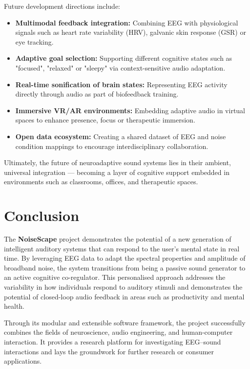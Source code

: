 Future development directions include:
\begin{itemize}
    \item \textbf{Multimodal feedback integration:} Combining EEG with physiological signals such as heart rate variability (HRV), galvanic skin response (GSR) or eye tracking.
    \item \textbf{Adaptive goal selection:} Supporting different cognitive states such as "focused", "relaxed" or "sleepy" via context-sensitive audio adaptation.
    \item \textbf{Real-time sonification of brain states:} Representing EEG activity directly through audio as part of biofeedback training.
    \item \textbf{Immersive VR/AR environments:} Embedding adaptive audio in virtual spaces to enhance presence, focus or therapeutic immersion.
    \item \textbf{Open data ecosystem:} Creating a shared dataset of EEG and noise condition mappings to encourage interdisciplinary collaboration.
\end{itemize}

Ultimately, the future of neuroadaptive sound systems lies in their ambient, universal integration — becoming a layer of cognitive support embedded in environments such as classrooms, offices, and therapeutic spaces.



\section{Conclusion}

The \textbf{NoiseScape} project demonstrates the potential of a new generation of intelligent auditory systems that can respond to the user’s mental state in real time. By leveraging EEG data to adapt the spectral properties and amplitude of broadband noise, the system transitions from being a passive sound generator to an active cognitive co-regulator. This personalised approach addresses the variability in how individuals respond to auditory stimuli and demonstrates the potential of closed-loop audio feedback in areas such as productivity and mental health.

Through its modular and extensible software framework, the project successfully combines the fields of neuroscience, audio engineering, and human-computer interaction. It provides a research platform for investigating EEG–sound interactions and lays the groundwork for further research or consumer applications. 


